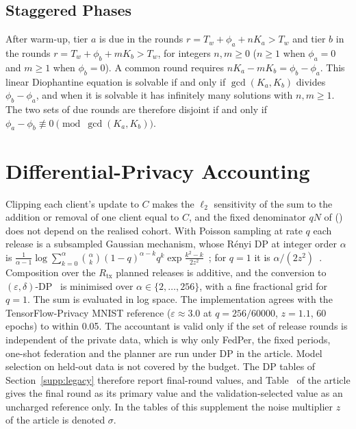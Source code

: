 \documentclass[journal]{IEEEtran}
\begin{document}
\subsection{Staggered Phases}
After warm-up, tier $a$ is due in the rounds $r=T_w+\phi_a+nK_a>T_w$ and tier $b$ in the rounds $r=T_w+\phi_b+mK_b>T_w$, for integers $n,m\ge0$ ($n\ge1$ when $\phi_a=0$ and $m\ge1$ when $\phi_b=0$). A common round requires $nK_a-mK_b=\phi_b-\phi_a$. This linear Diophantine equation is solvable if and only if $\gcd(K_a,K_b)$ divides $\phi_b-\phi_a$, and when it is solvable it has infinitely many solutions with $n,m\ge1$. The two sets of due rounds are therefore disjoint if and only if $\phi_a-\phi_b\not\equiv0\pmod{\gcd(K_a,K_b)}$.

\section{Differential-Privacy Accounting}
\label{supp:dp}
Clipping each client's update to $C$ makes the $\ell_2$ sensitivity of the sum to the addition or removal of one client equal to $C$, and the fixed denominator $qN$ of () does not depend on the realised cohort. With Poisson sampling at rate $q$ each release is a subsampled Gaussian mechanism, whose R\'enyi DP at integer order $\alpha$ is $\frac1{\alpha-1}\log\sum_{k=0}^{\alpha}\binom{\alpha}{k}(1-q)^{\alpha-k}q^k\exp\frac{k^2-k}{2z^2}$~\cite{mironov2019sgm}; for $q=1$ it is $\alpha/(2z^2)$~\cite{mironov2017}. Composition over the $R_{\mathrm{tx}}$ planned releases is additive, and the conversion to $(\varepsilon,\delta)$-DP~\cite{mironov2017} is minimised over $\alpha\in\{2,\dots,256\}$, with a fine fractional grid for $q=1$. The sum is evaluated in log space. The implementation agrees with the TensorFlow-Privacy MNIST reference ($\varepsilon\approx3.0$ at $q=256/60000$, $z=1.1$, 60 epochs) to within 0.05. The accountant is valid only if the set of release rounds is independent of the private data, which is why only FedPer, the fixed periods, one-shot federation and the planner are run under DP in the article. Model selection on held-out data is not covered by the budget. The DP tables of Section~\ref{supp:legacy} therefore report final-round values, and Table~ of the article gives the final round as its primary value and the validation-selected value as an uncharged reference only. In the tables of this supplement the noise multiplier $z$ of the article is denoted $\sigma$.
\end{document}
